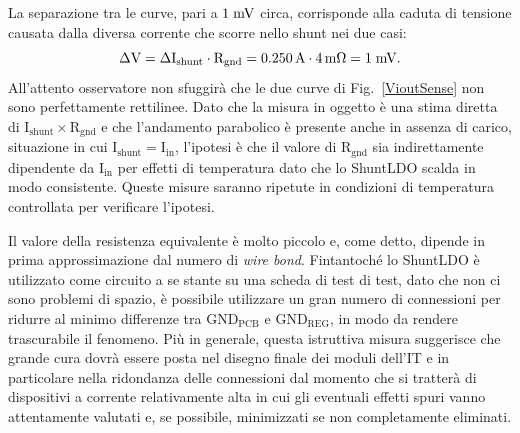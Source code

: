 La separazione tra le curve, pari a $1\rm \; mV$ circa, corrisponde alla caduta di tensione causata dalla diversa corrente che scorre nello shunt nei due casi:
\begin{equation}
\mathrm{\Delta V = \Delta I_{shunt} \cdot R_{gnd} = 0.250\rm \, A \cdot 4{\rm \, m\Omega} = 1\rm \; mV}.
\end{equation}
All'attento osservatore non sfuggir\`a che le due curve di Fig.~\ref{VioutSense} non sono perfettamente rettilinee. Dato che la misura in oggetto \`e una stima diretta di $\mathrm{I_{shunt}\times R_{gnd}}$ e che l'andamento parabolico \`e presente anche in assenza di carico, situazione in cui $\mathrm{I_{shunt}=I_{in}}$, l'ipotesi \`e che il valore di $\mathrm{R_{gnd}}$ sia indirettamente dipendente da $\mathrm{I_{in}}$ per effetti di temperatura dato che lo ShuntLDO scalda in modo consistente. Queste misure saranno ripetute in condizioni di temperatura controllata per verificare l'ipotesi.

%

Il valore della resistenza equivalente è molto piccolo e, come detto, dipende in prima approssimazione dal numero di \textit{wire bond}.
Fintantoché lo ShuntLDO è utilizzato come circuito a se stante su una scheda di test di test, dato che non ci sono problemi di spazio, è possibile utilizzare un gran numero di connessioni per ridurre al minimo differenze tra $\mathrm{GND_{PCB}}$ e $\mathrm{GND_{REG}}$, in modo da rendere trascurabile il fenomeno. 
Pi\`u in generale, questa istruttiva misura suggerisce che grande cura dovr\`a essere posta nel disegno finale dei moduli dell'IT e in particolare nella ridondanza delle connessioni dal momento che si tratter\`a di dispositivi a corrente relativamente alta in cui gli eventuali effetti spuri vanno attentamente valutati e, se possibile, minimizzati se non completamente eliminati.


